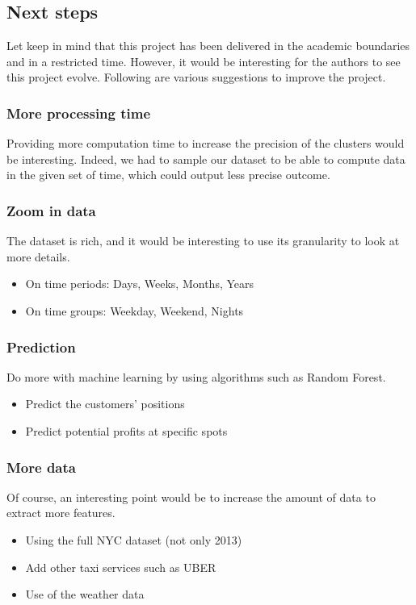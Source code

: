 \documentclass[a4paper]{article}
\begin{document}
\subsection{Next steps}
Let keep in mind that this project has been delivered in the academic boundaries and in a restricted time. However, it would be interesting for the authors to see this project evolve. Following are various suggestions to improve the project.

\subsubsection{More processing time}
Providing more computation time to increase the precision of the clusters would be interesting. Indeed, we had to sample our dataset to be able to compute data in the given set of time, which could output less precise outcome.

\subsubsection{Zoom in data}
The dataset is rich, and it would be interesting to use its granularity to look at more details.
\begin{itemize}
    \item On time periods: Days, Weeks, Months, Years
    \item On time groups: Weekday, Weekend, Nights
\end{itemize}

\subsubsection{Prediction}
Do more with machine learning by using algorithms such as Random Forest.
\begin{itemize}
    \item Predict the customers' positions
    \item Predict potential profits at specific spots
\end{itemize}

\subsubsection{More data}
Of course, an interesting point would be to increase the amount of data to extract more features.
\begin{itemize}
    \item Using the full NYC dataset (not only 2013)
    \item Add other taxi services such as UBER
    \item Use of the weather data
\end{itemize}
\end{document}
